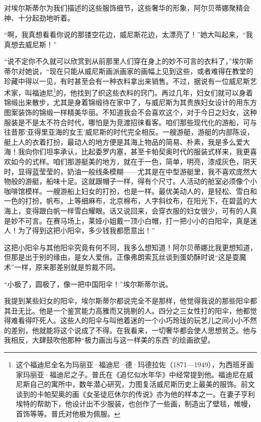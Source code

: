 \par 对埃尔斯蒂尔为我们描述的这些服饰细节，这些奢华的形象，阿尔贝蒂娜聚精会神、十分起劲地听着。
\par “啊，我真想看看你说的那镂空花边，威尼斯花边，太漂亮了！”她大叫起来，“我真想去威尼斯！”
\par “说不定你不久就可以欣赏到从前那里人们穿在身上的妙不可言的衣料了，”埃尔斯蒂尔对她说，“现在只能从威尼斯画派画家的画幅上见到这些，或者难得在教堂的珍藏中得以一见，有时甚至会有一种衣料拿出来销售。不过，据说有一位威尼斯艺术家，叫福迪尼\footnote{这个福迪尼全名为玛丽亚·福迪尼·德·玛德拉佐（1871—1949），为西班牙画家玛丽亚·福迪尼之子。普氏在《追忆似水年华》中经常提到他。福迪尼在威尼斯自己的寓所中，数年潜心研究，力图复活威尼斯历史上最美的服饰。前文谈到的卡帕契奥的画《女圣徒厄休尔的传说》亦为他的样本之一。在妻子亨利埃特的帮助下，他设计出不少服装，也创作了一些画，制造出了壁毯，帷幔，首饰等等。普氏对他极为佩服。}的，他找到了织这些衣料的窍门。再过几年，妇女们就可以身着锦缎出来散步，尤其是身着锦缎待在家中了，与威尼斯为其贵族妇女设计的用东方图案装饰的锦缎一样精美华丽。不知道我会不会喜欢这个，对于今日之妇女，这种服装是不是太不符合时代，哪怕是为竞渡招徕看客。咱们那些现代化的游船，可与往昔那‘亚得里亚海的女王’威尼斯的时代完全相反。一艘游艇，游艇的内部陈设，艇上人的衣着打扮，最动人的地方便是其海上物品的简易、朴素，我是多么爱大海！我向你们坦率承认，比起委罗内塞，甚至卡帕契奥时代的服装式样来，我更喜欢如今的式样。咱们那游艇美的地方，就在于一色，简单，明亮，漆成灰色，阴天时，显得蓝莹莹的，奶油一般线条模糊——尤其是在中型游艇里，我不喜欢庞然大物般的游艇，船味十足。这就跟帽子一样，得有个尺寸。人活动的舱室必须像个小咖啡馆模样。一艘游船上妇女的打扮，也是一样。最优美动人的，是轻松、雪白和一色的打扮，帆布，上等细麻布，北京棉布，人字斜纹布，在阳光下，在碧蓝的大海上，变得跟白帆一样雪白耀眼。话又说回来，会穿衣服的妇女很少，可有的人真是妙不可言。在赛马场上，莱娅小姐戴一顶小白帽，打一把小小的白阳伞，真是迷人！为了得到这把小阳伞，多少钱我都愿意出！”
\par 这把小阳伞与其他阳伞究竟有何不同，我多么想知道！阿尔贝蒂娜比我更想知道，但那是出于别的缘由，是女人爱俏。正像弗朗索瓦丝谈到蛋奶酥时说“这是耍魔术”一样，原来那差别就是剪裁不同。
\par “小极了，圆极了，像一把中国阳伞！”埃尔斯蒂尔说。
\par 我提到某些妇女的阳伞，埃尔斯蒂尔都说完全不是那样，他觉得我说的那些阳伞都其丑无比。他是一个鉴赏能力高雅而又挑剔的人。四分之三女性打的阳伞，他都觉得难看得吓死人。这些人的阳伞与叫他着迷的一个小巧玲珑的玩艺儿之间小小不然的差别，他就能将这个说成了不得。在我看来，一切奢华都会使人思想贫乏。他与我相反，大肆鼓吹他那种“极力画出与这一样美的东西”的绘画欲望。
